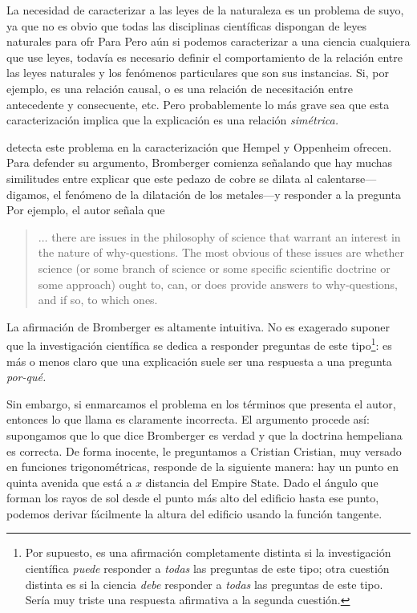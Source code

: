 La necesidad de caracterizar a las leyes de la naturaleza es
un problema de suyo, ya que no es obvio que todas las
disciplinas científicas  dispongan de leyes naturales para
ofr%
Para%
Pero aún si podemos
caracterizar a una ciencia cualquiera que use leyes, todavía es
necesario definir el comportamiento de la
relación entre las leyes naturales y los
fenómenos particulares que son sus instancias. Si, por
ejemplo, es una relación causal, o es una relación de
necesitación entre antecedente y consecuente, etc. Pero
probablemente lo más grave sea que esta
caracterización implica que la explicación es una relación
\emph{simétrica.}


detecta este problema en la caracterización que Hempel y
Oppenheim ofrecen. Para defender su argumento, Bromberger
comienza señalando que hay muchas similitudes entre explicar
que este pedazo de cobre se dilata al calentarse---digamos,
el fenómeno de la dilatación de los metales---y responder a
la pregunta  Por ejemplo, el autor señala que

	\begin{quote}
    $ \ldots $ there are issues in the philosophy of science
    that warrant an interest in the nature of why-questions.
    The most obvious of these issues are whether science (or
    some branch of science or some specific scientific
    doctrine or some approach) ought to, can, or does
    provide answers to why-questions, and if so, to which
    ones.
	\end{quote}

La afirmación de Bromberger es altamente intuitiva. No
es exagerado suponer que la investigación científica
se dedica a responder preguntas de este tipo\footnote{
  Por supuesto, es una afirmación	completamente distinta si
  la	investigación científica \emph{puede} responder a
  \emph{todas} las preguntas de este tipo; otra cuestión
  distinta es si la	ciencia \emph{debe} responder a
  \emph{todas} las preguntas de este tipo. Sería muy triste
  una respuesta afirmativa a la segunda cuestión.
}:
es más o menos claro que una explicación suele ser una
respuesta a una pregunta \emph{por-qué.}

Sin embargo, si  enmarcamos el problema en los términos que
presenta el autor, entonces lo que llama  es claramente incorrecta. El argumento procede
así: supongamos que lo que dice Bromberger es verdad y que
la doctrina hempeliana es correcta. De forma inocente, le
preguntamos a Cristian  Cristian, muy versado en
funciones trigonométricas, responde de la siguiente manera:
hay un punto en quinta  avenida que está a $ x $ distancia
del Empire State. Dado el ángulo que forman los rayos de sol
desde el punto más alto del edificio hasta ese punto,
podemos derivar fácilmente la altura del edificio usando la
función tangente.

